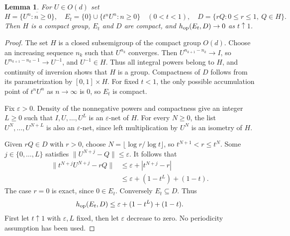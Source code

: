 \documentclass[11pt]{article}
\newtheorem{lemma}{Lemma}
\begin{document}
\begin{lemma}\label{powers}
For $U\in O(d)$ set
\[
 H=\overline{\{U^n:n\ge0\}},\quad
 E_t=\{0\}\cup\{t^nU^n:n\ge0\}\quad(0<t<1),\quad
 D=\{rQ:0\le r\le1,\ Q\in H\}.
\]
Then $H$ is a compact group, $E_t$ and $D$ are compact, and
$h_{\rm op}(E_t,D)\to0$ as $t\uparrow1$.
\end{lemma}
\begin{proof}
The set $H$ is a closed subsemigroup of the compact group $O(d)$.
Choose an increasing sequence $n_k$ such that $U^{n_k}$ converges. Then
$U^{n_{k+1}-n_k}\to I$, so $U^{n_{k+1}-n_k-1}\to U^{-1}$, and $U^{-1}\in H$.
Thus all integral powers belong to $H$, and continuity of inversion shows
that $H$ is a group. Compactness of $D$ follows from its parametrization
by $[0,1]\times H$. For fixed $t<1$, the only possible accumulation point
of $t^nU^n$ as $n\to\infty$ is $0$, so $E_t$ is compact.

Fix $\varepsilon>0$. Density of the nonnegative powers and compactness give
an integer $L\ge0$ such that $I,U,\ldots,U^L$ is an $\varepsilon$-net of $H$.
For every $N\ge0$, the list $U^N,\ldots,U^{N+L}$ is also an
$\varepsilon$-net, since left multiplication by $U^N$ is an isometry of $H$.

Given $rQ\in D$ with $r>0$, choose
$N=\lfloor\log r/\log t\rfloor$, so $t^{N+1}<r\le t^N$.
Some $j\in\{0,\ldots,L\}$ satisfies $\|U^{N+j}-Q\|\le\varepsilon$.
It follows that
\begin{align*}
 \|t^{N+j}U^{N+j}-rQ\|
 &\le \varepsilon+|t^{N+j}-r|\\
 &\le \varepsilon+(1-t^L)+(1-t).
\end{align*}
The case $r=0$ is exact, since $0\in E_t$. Conversely $E_t\subseteq D$.
Thus
\begin{equation}\label{netbound}
 h_{\rm op}(E_t,D)\le\varepsilon+(1-t^L)+(1-t).
\end{equation}
First let $t\uparrow1$ with $\varepsilon,L$ fixed, then let $\varepsilon$
decrease to zero. No periodicity assumption has been used.
\end{proof}
\end{document}
